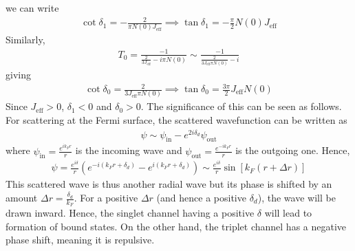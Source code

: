 \documentclass[twoside,11pt]{report}
\numberwithin{equation}{section}
\begin{document}
we can write
\begin{equation}\begin{aligned}
\cot \delta_1 = -\frac{2}{\pi N(0) J_\text{eff}}\implies \tan \delta_1 = -\frac{\pi}{2} N(0) J_\text{eff}
\end{aligned}\end{equation} 
Similarly,
\begin{equation}\begin{aligned}
T_0 =  \frac{-1}{\frac{2}{3 J_\text{eff}} - i\pi N(0)} \sim \frac{-1}{\frac{2}{3 J_\text{eff} \pi N(0)} - i}
\end{aligned}\end{equation}
giving
\begin{equation}\begin{aligned}
\cot \delta_0 = \frac{2}{3 J_\text{eff} \pi N(0)} \implies \tan \delta_0 = \frac{3\pi}{2} J_\text{eff} N(0)
\end{aligned}\end{equation}
Since \(J_\text{eff} > 0\), \(\delta_1 < 0\) and \(\delta_0 > 0\).
The significance of this can be seen as follows.
For scattering at the Fermi surface, the scattered wavefunction can be written as
\begin{equation}\begin{aligned}
\psi \sim \psi_\text{in} - e^{2 i \delta_d} \psi_\text{out}
\end{aligned}\end{equation}
where \(\psi_\text{in} = \frac{e^{ik_F r}}{r}\) is the incoming wave and \(\psi_\text{out} = \frac{e^{-ik_F r}}{r}\) is the outgoing one.
Hence,
\begin{equation}\begin{aligned}
	\psi = \frac{e^{i \delta}}{r} \left(e^{-i\left(k_Fr + \delta_d\right)} - e^{i\left(k_Fr + \delta_d\right)}\right) \sim \frac{e^{i \delta}}{r} \sin \left[k_F\left(r + \Delta r\right)\right]
\end{aligned}\end{equation}
This scattered wave is thus another radial wave but its phase is shifted by an amount \(\Delta r = \frac{\delta_d}{k_F}\).
For a positive \(\Delta r\) (and hence a positive \(\delta_d\)), the wave will be drawn inward.
Hence, the singlet channel having a positive \(\delta\) will lead to formation of bound states.
On the  other hand, the triplet channel has a negative phase shift, meaning it is repulsive.
\end{document}

